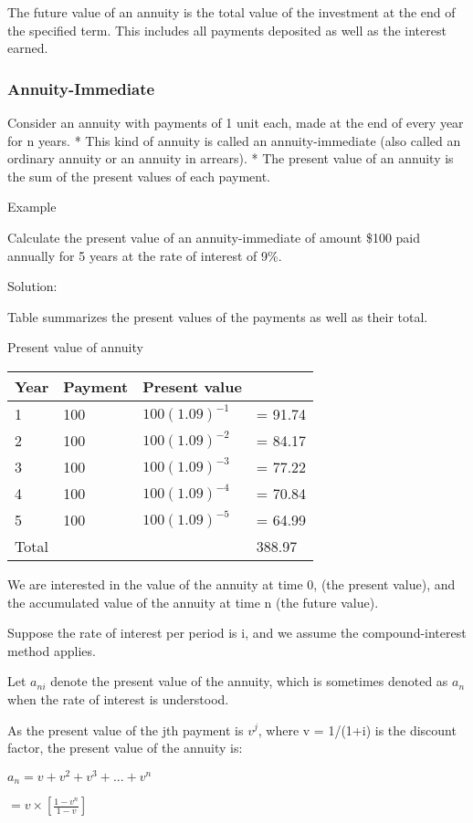 \documentclass[]{book}
\theoremstyle{definition}
\theoremstyle{definition}
\theoremstyle{definition}
\theoremstyle{remark}
\begin{document}
The future value of an annuity is the total value of the investment at
the end of the specified term. This includes all payments deposited as
well as the interest earned.

\subsubsection{Annuity-Immediate}\label{annuity-immediate}

Consider an annuity with payments of 1 unit each, made at the end of
every year for n years. * This kind of annuity is called an
annuity-immediate (also called an ordinary annuity or an annuity in
arrears). * The present value of an annuity is the sum of the present
values of each payment.

Example

Calculate the present value of an annuity-immediate of amount \$100 paid
annually for 5 years at the rate of interest of 9\%.

Solution:

Table summarizes the present values of the payments as well as their
total.

Present value of annuity

\begin{longtable}[]{@{}llll@{}}
\toprule
Year & Payment & Present value &\tabularnewline
\midrule
\endhead
1 & 100 & \(100 (1.09)^{-1}\) & = 91.74\tabularnewline
2 & 100 & \(100 (1.09)^{-2}\) & = 84.17\tabularnewline
3 & 100 & \(100 (1.09)^{-3}\) & = 77.22\tabularnewline
4 & 100 & \(100 (1.09)^{-4}\) & = 70.84\tabularnewline
5 & 100 & \(100 (1.09)^{-5}\) & = 64.99\tabularnewline
Total & & & 388.97\tabularnewline
\bottomrule
\end{longtable}

We are interested in the value of the annuity at time 0, (the present
value), and the accumulated value of the annuity at time n (the future
value).

Suppose the rate of interest per period is i, and we assume the
compound-interest method applies.

Let \(a_{ni}\) denote the present value of the annuity, which is
sometimes denoted as \(a_{n}\) when the rate of interest is understood.

As the present value of the jth payment is \(v^{j}\), where v = 1/(1+i)
is the discount factor, the present value of the annuity is:

\(a_{n}= v + v^{2} + v^{3}+...+ v^{n}\)

\(= v \times\left [ \frac{1-v^n}{1-v} \right ]\)
\end{document}
